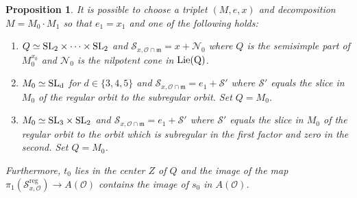 \documentclass{amsart}
\newtheorem{proposition}[theorem]{Proposition}
\theoremstyle{definition}
\DeclareMathOperator{\reg}{reg}
\newcommand{\cN}{\mathcal{N}}
\newcommand{\cS}{\mathcal{S}}
\newcommand{\frakm}{\mathfrak{m}}
\newcommand{\0}{\mathcal{O}}
\begin{document}
\begin{proposition}\label{prop:key_slice_typeA}
It is possible to choose a triplet $(M,e,x)$ and decomposition $M=M_0 \cdot M_1$ so that $e_1=x_1$ and one of the following holds:   
\begin{enumerate}
    \item $Q \simeq \rm{SL}_2 \times \dots \times \rm{SL}_2$ and  
    $\cS_{x, \0 \cap \frakm} = x+\cN_0$ where 
    $Q$ is the semisimple part of $M_0^{x_0}$
    and $\cN_0$ is the nilpotent cone in $\rm Lie(Q)$.
    \item $M_0 \simeq \rm{SL}_d$ for $d \in \{3,4,5\}$ and 
    $\cS_{x, \0 \cap \frakm} = e_1 + \cS'$ where $\cS'$ equals the slice in $M_0$ of the regular orbit to the subregular orbit.  Set $Q=M_0$.
    \item $M_0 \simeq \rm{SL}_3 \times \rm{SL}_2$ and
    $\cS_{x, \0 \cap \frakm} = e_1 + \cS'$ where $\cS'$ equals the slice in $M_0$ of the regular orbit to the orbit which is subregular
    in the first factor and zero in the second. Set $Q=M_0$.
\end{enumerate}
Furthermore, $t_0$ lies in the center $Z$ of $Q$ and 
the image of the map $\pi_1(\cS^{\reg}_{x, \0}) \to A(\0)$ contains the image of $s_0$ in $A(\0)$.
\end{proposition}
\end{document}
